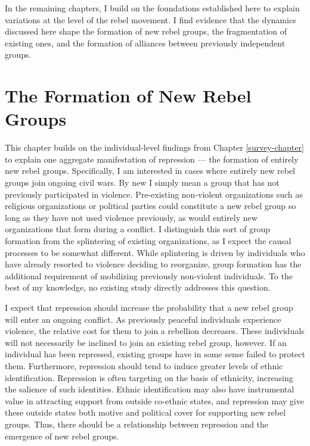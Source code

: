 \documentclass[12pt,]{book}
\theoremstyle{definition}
\theoremstyle{definition}
\theoremstyle{definition}
\theoremstyle{remark}
\begin{document}
In the remaining chapters, I build on the foundations established here
to explain variations at the level of the rebel movement. I find
evidence that the dynamics discussed here shape the formation of new
rebel groups, the fragmentation of existing ones, and the formation of
alliances between previously independent groups.

\hypertarget{entry}{%
\chapter{The Formation of New Rebel Groups}\label{entry}}

This chapter builds on the individual-level findings from Chapter
\ref{survey-chapter} to explain one aggregate manifestation of
repression --- the formation of entirely new rebel groups. Specifically,
I am interested in cases where entirely new rebel groups join ongoing
civil wars. By new I simply mean a group that has not previously
participated in violence. Pre-existing non-violent organizations such as
religious organizations or political parties could constitute a new
rebel group so long as they have not used violence previously, as would
entirely new organizations that form during a conflict. I distinguish
this sort of group formation from the splintering of existing
organizations, as I expect the causal processes to be somewhat
different. While splintering is driven by individuals who have already
resorted to violence deciding to reorganize, group formation has the
additional requirement of mobilizing previously non-violent individuals.
To the best of my knowledge, no existing study directly addresses this
question.

I expect that repression should increase the probability that a new
rebel group will enter an ongoing conflict. As previously peaceful
individuals experience violence, the relative cost for them to join a
rebellion decreases. These individuals will not necessarily be inclined
to join an existing rebel group, however. If an individual has been
repressed, existing groups have in some sense failed to protect them.
Furthermore, repression should tend to induce greater levels of ethnic
identification. Repression is often targeting on the basis of ethnicity,
increasing the salience of such identities. Ethnic identification may
also have instrumental value in attracting support from outside
co-ethnic states, and repression may give these outside states both
motive and political cover for supporting new rebel groups. Thus, there
should be a relationship between repression and the emergence of new
rebel groups.
\end{document}
